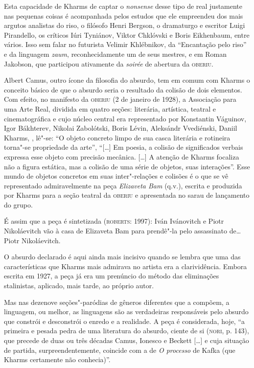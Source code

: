 Esta capacidade de Kharms de captar o \emph{nonsense} desse tipo de real
justamente nas pequenas coisas é acompanhada pelos estudos que ele
empreendeu dos mais argutos analistas do riso, o filósofo Henri Bergson,
o dramaturgo e escritor Luigi Pirandello, os críticos Iúri Tyniánov,
Viktor Chklóvski e Boris Eikhenbaum, entre vários. Isso sem falar no
futurista Velimir Khlébnikov, da ``Encantação pelo riso'' e da linguagem
\emph{zaum}, reconhecidamente um de seus mestres, e em Roman Jakobson,
que participou ativamente da \emph{soirée} de abertura da
\textsc{oberiu}.

Albert Camus, outro ícone da filosofia do absurdo, tem em comum com
Kharms o conceito básico de que o absurdo seria o resultado da colisão
de dois elementos. Com efeito, no manifesto da \textsc{oberiu} (2 de
janeiro de 1928), a Associação para uma Arte Real, dividida em quatro
seções: literária, artística, teatral e cinematográfica e cujo núcleo
central era representado por Konstantin Váguinov, Igor Bákhterev,
Nikolai Zabolótski, Boris Lévin, Aleksándr Vvediénski, Daniil Kharms, ,
lê"-se: ``O objeto concreto limpo de sua casca literária e rotineira
torna"-se propriedade da arte'', ``{[}\ldots{}{]} Em poesia, a colisão de
significados verbais expressa esse objeto com precisão mecânica.
{[}\ldots{}{]} A atenção de Kharms focaliza não a figura estática, mas a
colisão de uma série de objetos, suas interações''. Esse mundo de
objetos concretos em suas inter"-relações e colisões é o que se vê
representado admiravelmente na peça \emph{Elizaveta Bam} (q.v.), escrita
e produzida por Kharms para a seção teatral da \textsc{oberiu} e
apresentada no sarau de lançamento do grupo.

É assim que a peça é sintetizada (\textsc{roberts}: 1997): Iván
Ivánovitch e Piotr Nikoláevitch vão à casa de Elizaveta Bam para
prendê"-la pelo assassinato de\ldots{} Piotr Nikoláevitch.

O absurdo declarado é aqui ainda mais incisivo quando se lembra que uma
das características que Kharms mais admirava no artista era a
clarividência. Embora escrita em 1927, a peça já era um prenúncio do
método das eliminações stalinistas, aplicado, mais tarde, ao próprio
autor.

Mas nas dezenove seções"-paródias de gêneros diferentes que a compõem, a
linguagem, ou melhor, as linguagens são as verdadeiras responsáveis pelo
absurdo que constrói e desconstrói o enredo e a realidade. A peça é
considerada, hoje, ``a primeira e pesada pedra de uma literatura do
absurdo, ciente de si (\textsc{nori}, p. 143), que precede de duas ou
três décadas Camus, Ionesco e Beckett {[}\ldots{}{]} e cuja situação de
partida, surpreendentemente, coincide com a de \emph{O processo}
de Kafka (que Kharms certamente não conhecia)''.

